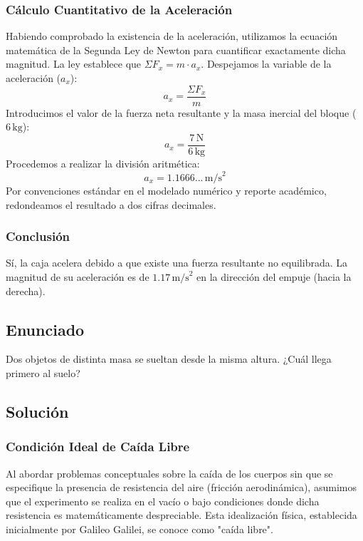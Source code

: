 \documentclass[12pt]{article}
\begin{document}
\subsubsection*{Cálculo Cuantitativo de la Aceleración}
Habiendo comprobado la existencia de la aceleración, utilizamos la ecuación matemática de la Segunda Ley de Newton para cuantificar exactamente dicha magnitud. La ley establece que $\Sigma F_x = m \cdot a_x$.
Despejamos la variable de la aceleración ($a_x$):
\begin{equation}
    a_x = \frac{\Sigma F_x}{m}
\end{equation}
Introducimos el valor de la fuerza neta resultante y la masa inercial del bloque ($6 \, \text{kg}$):
\begin{equation}
    a_x = \frac{7 \, \text{N}}{6 \, \text{kg}}
\end{equation}
Procedemos a realizar la división aritmética:
\begin{equation}
    a_x = 1.1666... \, \text{m/s}^2
\end{equation}
Por convenciones estándar en el modelado numérico y reporte académico, redondeamos el resultado a dos cifras decimales.

\subsubsection*{Conclusión}
Sí, la caja acelera debido a que existe una fuerza resultante no equilibrada. La magnitud de su aceleración es de $1.17 \, \text{m/s}^2$ en la dirección del empuje (hacia la derecha).

\newpage

\subsection*{Enunciado}
Dos objetos de distinta masa se sueltan desde la misma altura. ¿Cuál llega primero al suelo?

\subsection*{Solución}

\subsubsection*{Condición Ideal de Caída Libre}
Al abordar problemas conceptuales sobre la caída de los cuerpos sin que se especifique la presencia de resistencia del aire (fricción aerodinámica), asumimos que el experimento se realiza en el vacío o bajo condiciones donde dicha resistencia es matemáticamente despreciable. Esta idealización física, establecida inicialmente por Galileo Galilei, se conoce como "caída libre".
\end{document}
